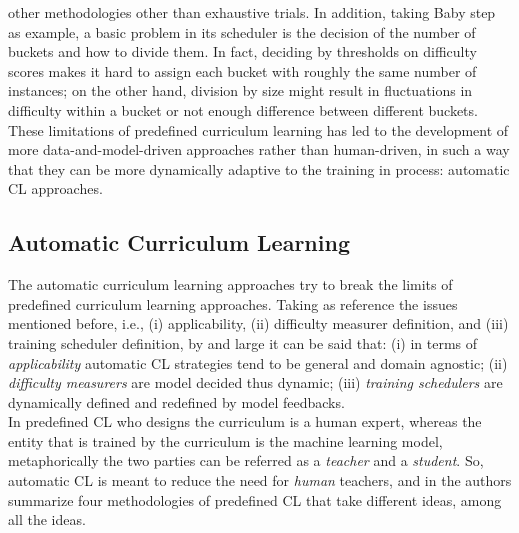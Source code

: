 other methodologies other than exhaustive trials. In addition, taking Baby step as example, 
a basic problem in its scheduler is the decision of the number of buckets and how to divide them. In fact, 
deciding by thresholds on difficulty scores makes it hard to assign each bucket with roughly the same number of instances; on 
the other hand, division by size might result in fluctuations in difficulty within a bucket or not enough difference between different 
buckets.\\
\newline
These limitations of predefined curriculum learning has led to the development 
of more data-and-model-driven approaches rather than human-driven, in such a way 
that they can be more dynamically adaptive to the training in process: automatic 
CL approaches.

\subsection{Automatic Curriculum Learning}
The automatic curriculum learning approaches try to break the limits of predefined curriculum learning approaches.
Taking as reference the issues mentioned before, i.e., (i) applicability, (ii) difficulty measurer definition, and (iii) training scheduler definition, 
by and large it can be said that: (i) in terms of \textit{applicability} automatic CL strategies 
tend to be general and domain agnostic; (ii) \textit{difficulty measurers} are model decided thus dynamic; (iii) \textit{training schedulers}
are dynamically defined and redefined by model feedbacks.\\
In predefined CL who designs the curriculum is a human expert, whereas the entity that is trained
by the curriculum is the machine learning model, metaphorically the two parties can be referred as 
a \textit{teacher} and a \textit{student}. So, automatic CL is meant
to reduce the need for \textit{human} teachers, and in \cite{wang2021survey} the authors summarize 
four methodologies of predefined CL that take different ideas, among all the ideas.


